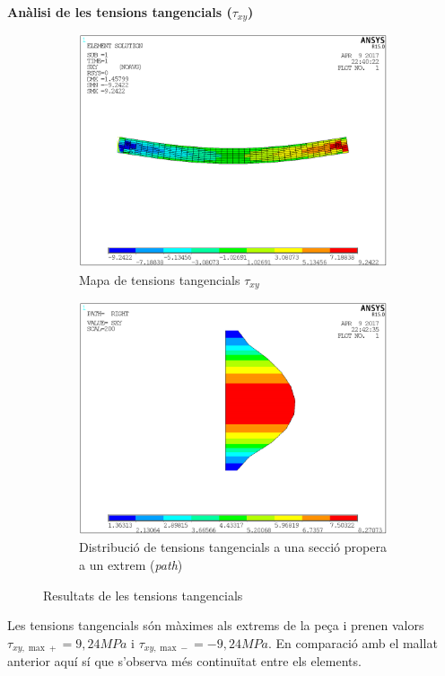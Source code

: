\documentclass[a4paper]{article}
\def\imgS{0.42\textwidth}
\begin{document}
\pagebreak
\textbf{Anàlisi de les tensions tangencials ($\tau_{xy}$)}
\begin{figure}[H]
	\begin{subfigure}[t]{\imgS}
		\includegraphics[width=\textwidth]{images/400_SXY}
		\caption{Mapa de tensions tangencials {$\tau_{xy}$}}
		\label{fig:400_SXY}
	\end{subfigure}
	\hfill
	\begin{subfigure}[t]{\imgS}
		\includegraphics[width=\textwidth]{images/400_SXY_path}
		\caption{Distribució de tensions tangencials a una secció propera a un extrem (\emph{path})}
		\label{fig:400_SXY_path}
	\end{subfigure}
	\caption{Resultats de les tensions tangencials}
	\label{fig:400_shear}
\end{figure}
Les tensions tangencials són màximes als extrems de la peça i prenen valors $\tau_{xy,\max+} = 9,24 MPa$ i $\tau_{xy,\max-} = -9,24 MPa$. En comparació amb el mallat anterior aquí sí que s'observa més continuïtat entre els elements.
\end{document}
